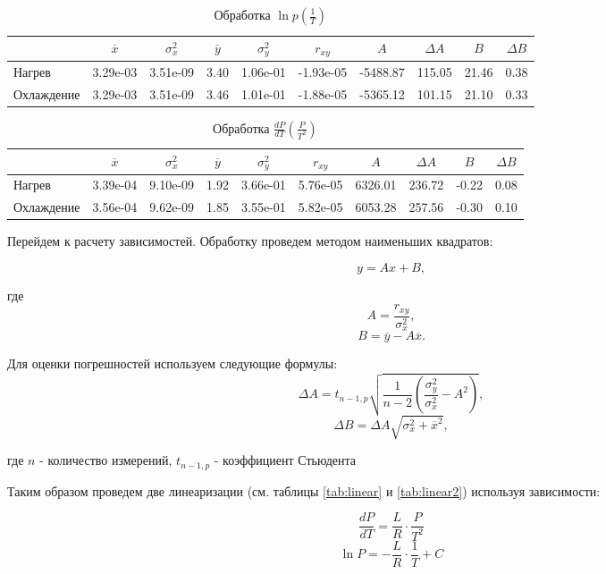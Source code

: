 \documentclass[12pt,a4paper]{article}
\begin{document}
\begin{table}
	\caption{Обработка $\ln{p}(\frac{1}{T})$}
	\label{tab:stat}
	\centering
	\footnotesize
	\begin{tabular}{l|ccccccccc}
		\toprule
		$ $ & $\overline{x}$ & $\sigma_x^2$ & $\overline{y}$ & $\sigma_y^2$ & $r_{xy}$ & $A$ & $\Delta A$ & $B$ & $\Delta B$ \\ \midrule
		Нагрев & 3.29e-03 & 3.51e-09 & 3.40 & 1.06e-01 & -1.93e-05 & -5488.87 & 115.05 & 21.46 & 0.38 \\ 
		Охлаждение & 3.29e-03 & 3.51e-09 & 3.46 & 1.01e-01 & -1.88e-05 & -5365.12 & 101.15 & 21.10 & 0.33 \\ \bottomrule
	\end{tabular}
\end{table}


\begin{table}
	\caption{Обработка $\frac{dP}{dT}(\frac{P}{T^2})$}
	\label{tab:dpstat}
	\centering
	\footnotesize
	\begin{tabular}{l|ccccccccc}
		\toprule
		$ $ & $\overline{x}$ & $\sigma_x^2$ & $\overline{y}$ & $\sigma_y^2$ & $r_{xy}$ & $A$ & $\Delta A$ & $B$ & $\Delta B$ \\ \midrule
		Нагрев & 3.39e-04 & 9.10e-09 & 1.92 & 3.66e-01 & 5.76e-05 & 6326.01 & 236.72 & -0.22 & 0.08 \\ 
		Охлаждение & 3.56e-04 & 9.62e-09 & 1.85 & 3.55e-01 & 5.82e-05 & 6053.28 & 257.56 & -0.30 & 0.10 \\ \bottomrule
	\end{tabular}
\end{table}


Перейдем к расчету зависимостей. Обработку проведем методом наименьших квадратов:

$$y = Ax + B,$$

где $$A = \frac{r_{xy}}{ \sigma_x^2},$$
$$B = \overline{y} - A\overline{x}.$$

Для оценки погрешностей используем следующие формулы:
$$\Delta A =  t_{n-1, p} \sqrt{\frac{1}{n-2} \left( \frac{\sigma_y^2}{\sigma_x^2} - A^2 \right)},$$
$$\Delta B = \Delta A \sqrt{\sigma_x^2 + \overline{x}^2},$$

где 
$n$ - количество измерений, $ t_{n-1, p}$ - коэффициент Стьюдента

Таким образом проведем две линеаризации (см. таблицы \ref{tab:linear} и \ref{tab:linear2}) используя зависимости:

$$\frac{dP}{dT} = \frac{L}{R} \cdot \frac{P}{T^2}$$
$$\ln{P} = -\frac{L}{R} \cdot \frac{1}{T} + C$$
\end{document}
